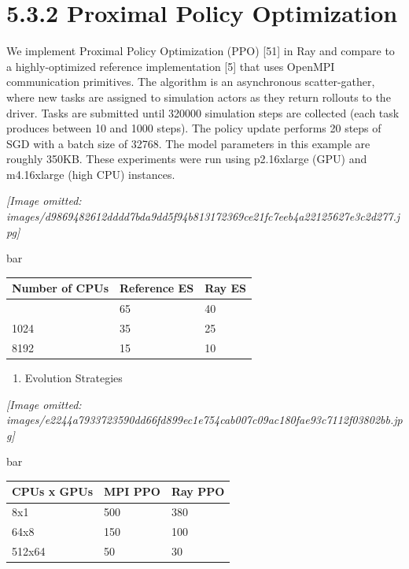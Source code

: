 \documentclass[
]{article}
\newcounter{none} %
\providecommand{\tightlist}{%
  \setlength{\itemsep}{0pt}\setlength{\parskip}{0pt}}
\begin{document}
\section{5.3.2 Proximal Policy
Optimization}\label{proximal-policy-optimization}

We implement Proximal Policy Optimization (PPO) {[}51{]} in Ray and
compare to a highly-optimized reference implementation {[}5{]} that uses
OpenMPI communication primitives. The algorithm is an asynchronous
scatter-gather, where new tasks are assigned to simulation actors as
they return rollouts to the driver. Tasks are submitted until 320000
simulation steps are collected (each task produces between 10 and 1000
steps). The policy update performs 20 steps of SGD with a batch size of
32768. The model parameters in this example are roughly 350KB. These
experiments were run using p2.16xlarge (GPU) and m4.16xlarge (high CPU)
instances.

\textit{[Image omitted: images/d9869482612dddd7bda9dd5f94b813172369ce21fc7eeb4a22125627e3c2d277.jpg]}

bar

{\def\LTcaptype{none} %
\begin{longtable}[]{@{}lll@{}}
\toprule\noalign{}
Number of CPUs & Reference ES & Ray ES \\
\midrule\noalign{}
\endhead
\bottomrule\noalign{}
\endlastfoot
256 & 65 & 40 \\
1024 & 35 & 25 \\
8192 & 15 & 10 \\
\end{longtable}
}

\begin{enumerate}
\def\labelenumi{(\alph{enumi})}
\tightlist
\item
  Evolution Strategies
\end{enumerate}

\textit{[Image omitted: images/e2244a7933723590dd66fd899ec1e754cab007c09ac180fae93c7112f03802bb.jpg]}

bar

{\def\LTcaptype{none} %
\begin{longtable}[]{@{}lll@{}}
\toprule\noalign{}
CPUs x GPUs & MPI PPO & Ray PPO \\
\midrule\noalign{}
\endhead
\bottomrule\noalign{}
\endlastfoot
8x1 & 500 & 380 \\
64x8 & 150 & 100 \\
512x64 & 50 & 30 \\
\end{longtable}
}
\end{document}
